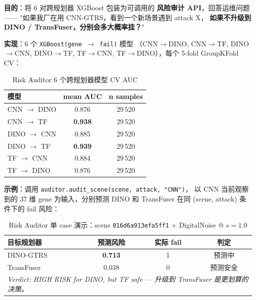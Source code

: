 \documentclass[a4paper,12pt,fontset=fandol]{ctexart}
\newcommand{\planner}[1]{\textsf{#1}}
\begin{document}
{\noindent\textbf{目的}：将 6 对跨规划器 XGBoost 包装为可调用的
\textbf{风险审计 API}，回答运维问题——
"如果我厂在用 CNN-GTRS，看到一个新场景遇到 attack X，
\textbf{如果不升级到 DINO / TransFuser，分别会多大概率挂？}"

\noindent\textbf{实现}：6 个 \texttt{XGBoost(gene $\to$ fail)} 模型
（CNN$\to$DINO, CNN$\to$TF, DINO$\to$CNN, DINO$\to$TF,
TF$\to$CNN, TF$\to$DINO），每个 5-fold GroupKFold CV：

\begin{table}[H]
\centering
\small
\caption{Risk Auditor 6 个跨规划器模型 CV AUC}
\label{tab:auditor}
\begin{tabular}{lcc}
\toprule
\textbf{模型} & \textbf{mean AUC} & \textbf{n samples} \\
\midrule
\planner{CNN}  $\to$ \planner{DINO}  & 0.876 & 29\,520 \\
\planner{CNN}  $\to$ \planner{TF}    & \textbf{0.938} & 29\,520 \\
\planner{DINO} $\to$ \planner{CNN}   & 0.885 & 29\,520 \\
\planner{DINO} $\to$ \planner{TF}    & \textbf{0.939} & 29\,520 \\
\planner{TF}   $\to$ \planner{CNN}   & 0.884 & 29\,520 \\
\planner{TF}   $\to$ \planner{DINO}  & 0.876 & 29\,520 \\
\bottomrule
\end{tabular}
\end{table}

\noindent\textbf{示例}：调用 \texttt{auditor.audit\_scene(scene, attack, "CNN")}，
以 CNN 当前观察到的 37 维 gene 为输入，分别预测
DINO 和 TransFuser 在同 (scene, attack) 条件下的 fail 风险：

\begin{table}[H]
\centering
\small
\caption{Risk Auditor 单 case 演示：scene \texttt{016d6a913efa5ff1} + DigitalNoise @ $s\!=\!1.0$}
\label{tab:auditor_demo}
\begin{tabular}{lccc}
\toprule
\textbf{目标规划器} & \textbf{预测风险} & \textbf{实际 fail} & \textbf{判定} \\
\midrule
\planner{DINO-GTRS}    & \textbf{0.713} & 1 & 预测中 \\
\planner{TransFuser}   & 0.038 & 0 & 预测安全 \\
\midrule
\multicolumn{4}{l}{\footnotesize\textit{Verdict: HIGH RISK for DINO, but TF safe — 升级到 TransFuser 是更划算的决策。}}
\end{tabular}
\end{table}

}
\end{document}
